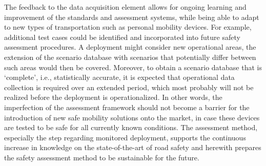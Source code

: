 The feedback to the data acquisition element allows for ongoing learning and improvement of the standards and assessment systems, while being able to adapt to new types of transportation such as personal mobility devices. For example, additional test cases could be identified and incorporated into future safety assessment procedures. A deployment might consider new operational areas, the extension of the scenario database with scenarios that potentially differ between such areas would then be covered. Moreover, to obtain a scenario database that is `complete', i.e., statistically accurate, it is expected that operational data collection is required over an extended period, which most probably will not be realized before the deployment is operationalized. In other words, the imperfection of the assessment framework should not become a barrier for the introduction of new safe mobility solutions onto the market, in case these devices are tested to be safe for all currently known conditions. The assessment method, especially the step regarding monitored deployment, supports the continuous increase in knowledge on the state-of-the-art of road safety and herewith prepares the safety assessment method to be sustainable for the future.
